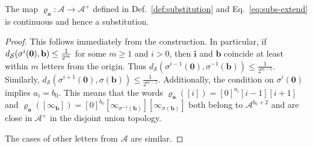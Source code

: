 %
\begin{prop}
The map $\varrho^{ }_\mathbf a\colon \mathcal{A}\to \mathcal{A}^{+}$ defined in Def.~\ref{def:substitution} and Eq.~\eqref{eq:subs-extend} is continuous and hence a substitution. 
\end{prop}
\begin{proof}
 This follows immediately from the construction. 
In particular, if $d_\mathcal S(\sigma^{i}(\mathbf{0}),{\bf{b}})\leq \frac{1}{2^m}$ for some $m\geq 1$ and $i>0$, then $\mathbf i$ and $\mathbf b$ coincide at least within $m$ letters from the origin. Thus
$d_\mathcal S(\sigma^{i-1}(\mathbf{0}),\sigma^{-1}(\mathbf{b}))\leq\frac{1}{2^{m-1}}$. Similarly,  $d_\mathcal S(\sigma^{i+1}(\mathbf{0}),\sigma(\mathbf{b}))\leq \frac{1}{2^{m-1}}$. 
Additionally, the condition on $\sigma^{i}(\mathbf{0})$ implies $a_i=b_0$. 
This means that the words $\varrho^{ }_{\mathbf{a}}([i])=[0]^{a_i}[i-1][i+1]$ and  $\varrho^{ }_{\mathbf{a}}([\infty_{\mathbf{b}}])=[0]^{b_0}[\infty_{\sigma^{-1}(\mathbf{b})}][\infty_{\sigma(\mathbf{b})}]$ both belong to $\mathcal{A}^{b_0+2}$ and are close in $\mathcal{A}^{+}$ in the disjoint union topology.

The cases of other letters from $\mathcal A$ are similar.
\end{proof}
%

